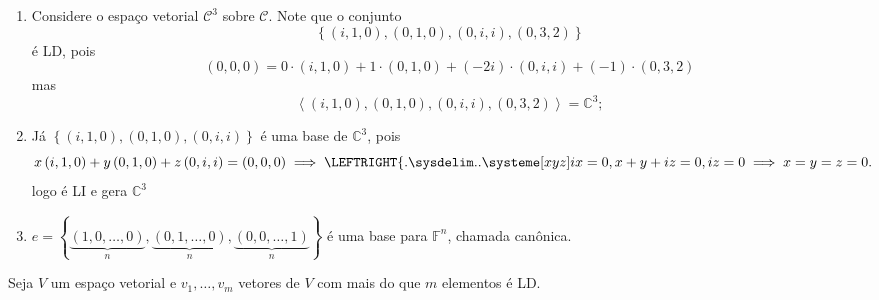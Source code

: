 \begin{example}
	\begin{enumerate}\leavevmode
		\item

		      Considere o espaço vetorial $\mathcal{C}^{3}$ sobre
		      $\mathcal{C}$.
		      Note que o conjunto
		      \[
			      \left\{
			      \left(i,1,0\right),
			      \left(0,1,0\right),
			      \left(0,i,i\right),
			      \left(0,3,2\right)
			      \right\}
		      \]
		      é LD, pois
		      \[
			      \left(0,0,0\right)=
			      0\cdot\left(i,1,0\right)+
			      1\cdot\left(0,1,0\right)+
			      \left(-2i\right)\cdot\left(0,i,i\right)+
			      \left(-1\right)\cdot\left(0,3,2\right)
		      \]
		      mas
		      \[
			      \left\langle
			      \left(i,1,0\right),
			      \left(0,1,0\right),
			      \left(0,i,i\right),
			      \left(0,3,2\right)
			      \right\rangle=
			      \mathbb{C}^{3};
		      \]
		\item

		      Já
		      \begin{math}
			      \left\{
			      \left(i,1,0\right),
			      \left(0,1,0\right),
			      \left(0,i,i\right)
			      \right\}
		      \end{math}
		      é uma base de $\mathbb{C}^{3}$, pois
		      \[
			      x\left(i,1,0\right)+
			      y\left(0,1,0\right)+
			      z\left(0,i,i\right)=
			      \left(0,0,0\right)
			      \implies
			      \csysteme[xyz]{
				      ix=0,
				      x+y+iz=0,
				      iz=0
			      }
			      \implies x=y=z=0.
		      \]
		      logo é LI e gera $\mathbb{C}^{3}$
		\item
		      \begin{math}
			      e=
			      \left\{
			      \underbrace{\left(1,0,\dotsc,0\right)}_{n},
			      \underbrace{\left(0,1,\dotsc,0\right)}_{n},
			      \underbrace{\left(0,0,\dotsc,1\right)}_{n}
			      \right\}
		      \end{math}
		      é uma base para $\mathbb{F}^{n}$, chamada canônica.
	\end{enumerate}
\end{example}

\begin{theorem}
	Seja $V$ um espaço vetorial e $v_{1},\dotsc,v_{m}$ vetores de $V$
	com mais do que $m$ elementos é LD.
\end{theorem}

